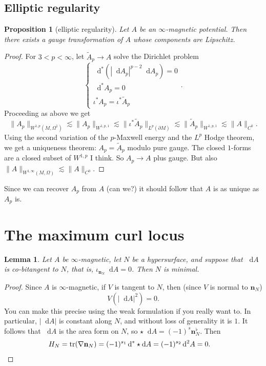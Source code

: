 \documentclass[reqno,11pt]{amsart}
\newcommand*\dif{\mathop{}\!\mathrm{d}}
\DeclareMathOperator{\tr}{tr}
\newcommand{\normal}{\mathbf n}
\newtheorem{lemma}[theorem]{Lemma}
\newtheorem{proposition}[theorem]{Proposition}
\theoremstyle{definition}
\numberwithin{equation}{section}
\begin{document}
\subsection{Elliptic regularity}
\begin{proposition}[elliptic regularity]
Let $A$ be an $\infty$-magnetic potential.
Then there exists a gauge transformation of $A$ whose components are Lipschitz.
\end{proposition}
\begin{proof}
For $3 < p < \infty$, let $\tilde A_p \to A$ solve the Dirichlet problem
$$\begin{cases}
	\dif^*(|\dif A_p|^{p - 2} \dif A_p) = 0 \\
	\dif^* A_p = 0 \\
	\iota^* A_p = \iota^* \tilde A_p
\end{cases}.$$
Proceeding as above we get
$$\|A_p\|_{W^{1, p}(M, \Omega^1)} \lesssim \|A_p\|_{W^{1, p, 1}} \lesssim \|\iota^* \tilde A_p\|_{L^p(\partial M)} \lesssim \|\tilde A_p\|_{W^{1, p, 1}} \lesssim \|A\|_{C^0}.$$
Using the second variation of the $p$-Maxwell energy and the $L^p$ Hodge theorem, we get a uniqueness theorem: $A_p = \tilde A_p$ modulo pure gauge.
The closed $1$-forms are a closed subset of $W^{1, p}$ I think. So $A_p \to A$ plus gauge.
But also $\|A\|_{W^{1, \infty}(M, \Omega)} \lesssim \|A\|_{C^0}$.
\end{proof}

Since we can recover $A_p$ from $A$ (can we?) it should follow that $A$ is as unique as $A_p$ is.

\section{The maximum curl locus}
\begin{lemma}
Let $A$ be $\infty$-magnetic, let $N$ be a hypersurface, and suppose that $\dif A$ is co-bitangent to $N$, that is, $\iota_{\normal_N} \dif A = 0$.
Then $N$ is minimal.
\end{lemma}
\begin{proof}
Since $A$ is $\infty$-magnetic, if $V$ is tangent to $N$, then (since $V$ is normal to $\normal_N$)
$$V(|\dif A|^2) = 0.$$
You can make this precise using the weak formulation if you really want to.
In particular, $|\dif A|$ is constant along $N$, and without loss of generality it is $1$.
It follows that $\dif A$ is the area form on $N$, so $\star \dif A = (-1)^s \normal_N^\flat$.
Then 
\begin{align*}
H_N &= \tr(\nabla \normal_N) = (-1)^{s_1} \dif^* \star \dif A = (-1)^{s_2} \dif^2 A = 0. \qedhere
\end{align*}
\end{proof}
\end{document}
